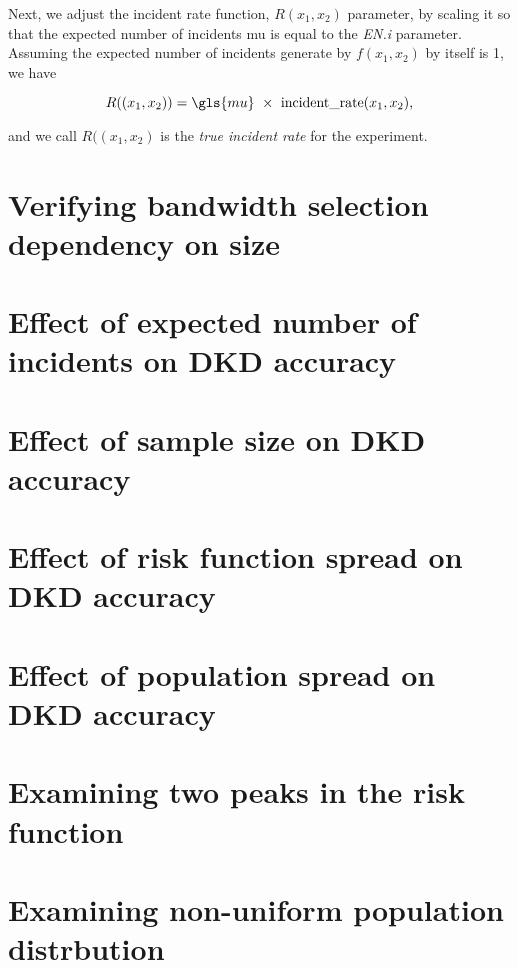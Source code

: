 Next, we adjust the incident rate function, \(R(x_1, x_2)\) parameter, by scaling it so that the expected number of incidents \gls{mu} is equal to the \textit{EN.i} parameter.
Assuming the expected number of incidents generate by \(f(x_1, x_2)\) by itself is 1, we have

\[
    R((x_1, x_2)) = \gls{mu}~\times~\mbox{incident\textunderscore rate}(x_1, x_2) \text{,}
\]

and we call \(R((x_1, x_2)\) is the \textit{true incident rate} for the experiment.

\section{Verifying bandwidth selection dependency on size}

\section{Effect of expected number of incidents on DKD accuracy}

\section{Effect of sample size on DKD accuracy}

\section{Effect of risk function spread on DKD accuracy}

\section{Effect of population spread on DKD accuracy}

\section{Examining two peaks in the risk function}

\section{Examining non-uniform population distrbution}

